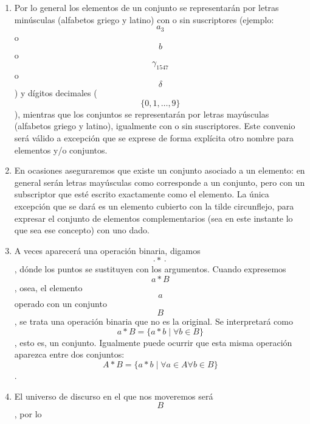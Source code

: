 \begin{enumerate}
\begin{enumerate}
    \begin{enumerate}
    \def\labelenumiii{\arabic{enumiii}.}
    \tightlist
    \item
      \begin{enumerate}
      \def\labelenumiv{\arabic{enumiv}.}
      \tightlist
      \item
        \[\lbrack 0,1\rbrack_{\mathbb{Q}}{: = {\lbrack 0,1\rbrack \cap \mathbb{Q}}}\].
      \item
        \[{\lbrack 0,1\rbrack_{\mathbb{Q}}}^{1}{: = \lbrack 0,1\rbrack_{\mathbb{Q}}}\].
      \item
        \[{\lbrack 0,1\rbrack_{\mathbb{Q}}}^{n}{: = {{\lbrack 0,1\rbrack_{\mathbb{Q}}}^{n - 1} \times {\lbrack 0,1\rbrack_{\mathbb{Q}}}^{1}}}\].
      \end{enumerate}
    \end{enumerate}
  \item
    Por lo general los elementos de un conjunto se representarán por
    letras minúsculas (alfa\-betos griego y latino) con o sin
    suscriptores (ejemplo:\[a_{3}\]o\[b\]o\[\gamma_{1547}\]o\[\delta\])
    y dí\-gitos decimales (\[\{{0,1,\ldots,9}\}\]), mientras que los
    conjuntos se representarán por letras mayúsculas (alfabetos griego y
    latino), igualmente con o sin suscriptores. Este convenio será
    válido a excepción que se exprese de forma explícita otro nombre
    para elementos y/o conjuntos.
  \item
    En ocasiones aseguraremos que existe un conjunto asociado a un
    elemento: en general serán letras mayúsculas como corresponde a un
    conjunto, pero con un subscriptor que esté escrito exactamente como
    el elemento. La única excepción que se dará es un elemento cubierto
    con la tilde circunflejo, para expresar el conjunto de elementos
    complementa\-rios (sea en este instante lo que sea ese concepto) con
    uno dado.
  \item
    A veces aparecerá una operación binaria,
    digamos\[{\cdot \ast} \cdot\], dónde los puntos se sustitu\-yen con
    los argumentos. Cuando expresemos \[a \ast B\] , osea, el elemento
    \[a\]operado con un conjunto \[B\], se trata una operación binaria
    que no es la original. Se interpreta\-rá como
    \[{a \ast B} = {\{{{a \ast b} \mid \forall{b \in B}}\}}\] , esto es,
    un conjunto. Igualmente puede ocurrir que esta misma operación
    aparezca entre dos conjuntos:
    \[{A \ast B} = {\{{{a \ast b} \mid {\forall{a \in A}\forall{b \in B}}}\}}\].
  \item
    El universo de discurso en el que nos moveremos será\[B\], por lo

\end{enumerate}
\end{enumerate}
